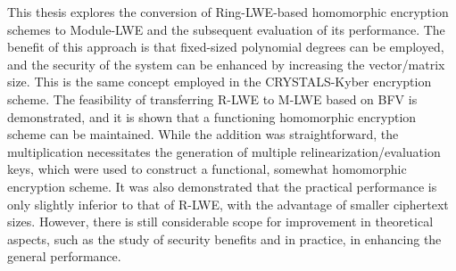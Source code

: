 This thesis explores the conversion of Ring-LWE-based homomorphic encryption schemes to Module-LWE and the subsequent evaluation of its performance. The benefit of this approach is that fixed-sized polynomial degrees can be employed, and the security of the system can be enhanced by increasing the vector/matrix size. This is the same concept employed in the CRYSTALS-Kyber encryption scheme. The feasibility of transferring R-LWE to M-LWE based on BFV is demonstrated, and it is shown that a functioning homomorphic encryption scheme can be maintained. While the addition was straightforward, the multiplication necessitates the generation of multiple relinearization/evaluation keys, which were used to construct a functional, somewhat homomorphic encryption scheme. It was also demonstrated that the practical performance is only slightly inferior to that of R-LWE, with the advantage of smaller ciphertext sizes. However, there is still considerable scope for improvement in theoretical aspects, such as the study of security benefits and in practice, in enhancing the general performance.